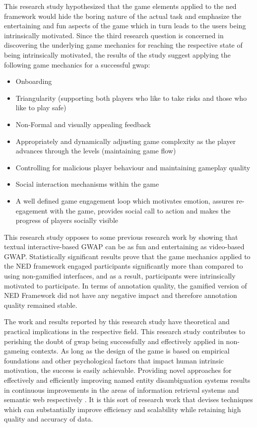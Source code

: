 This research study hypothesized that the game elements applied to the \ac{ned} framework would hide the boring nature of the actual task and emphasize the entertaining and fun aspects of the game which in turn leads to the users being intrinsically motivated. Since the third research question is concerned in discovering the underlying game mechanics for reaching the respective state of being intrinsically motivated, the results of the study suggest applying the following game mechanics for a successful \ac{gwap}: 
\begin{itemize}
    \item Onboarding
    \item Triangularity (supporting both players who like to take risks and those who like to play safe)
    \item Non-Formal and visually appealing feedback
    \item Appropriately and dynamically adjusting game complexity as the player advances through the levels (maintaining game flow)
    \item Controlling for malicious player behaviour and maintaining gameplay quality
    \item Social interaction mechanisms within the game
    \item A well defined game engagement loop which motivates emotion, assures re-egagement with the game, provides social call to action and makes the progress of players socially visible
\end{itemize}
\if This research study opposes to some previous research work \cite{54} by showing that textual interactive-based GWAP can be as fun and entertaining as video-based GWAP. Statistically significant results prove that the game mechanics applied to the NED framework engaged participants significantly more than compared to using non-gamified interfaces, and as a result, participants were intrinsically motivated to participate. In terms of annotation quality, the gamified version of NED Framework did not have any negative impact and therefore annotation quality remained stable.\fi


The work and results reported by this research study have theoretical and practical implications in the respective field. This research study contributes to perishing the doubt of \ac{gwap} being successfully and effectively applied in non-gameing contexts. As long as the design of the game is based on empirical foundations and other psychological factors that impact human intrinsic motivation, the success is easily achievable. Providing novel approaches for effectively and efficiently improving named entity disambiguation systems results in continuous improvements in the areas of information retrieval systems and semantic web respectively \cite{12}. It is this sort of research work that devises techniques which can substantially improve efficiency and scalability while retaining high quality and accuracy of data. \hfill \break


